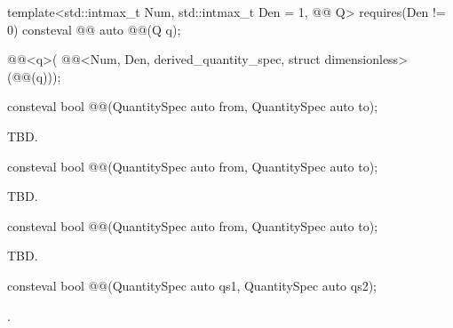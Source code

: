 \begin{itemdecl}
template<std::intmax_t Num, std::intmax_t Den = 1, @@ Q>
  requires(Den != 0)
consteval @@ auto @@(Q q);
\end{itemdecl}

\begin{itemdescr}
\pnum
\returns
\begin{codeblock}
@@<q>(
  @@<Num, Den, derived_quantity_spec, struct dimensionless>(@@(q)));
\end{codeblock}
\end{itemdescr}

\begin{itemdecl}
consteval bool @@(QuantitySpec auto from, QuantitySpec auto to);
\end{itemdecl}

\begin{itemdescr}
\pnum
\returns
TBD.
\end{itemdescr}

\begin{itemdecl}
consteval bool @@(QuantitySpec auto from, QuantitySpec auto to);
\end{itemdecl}

\begin{itemdescr}
\pnum
\returns
TBD.
\end{itemdescr}

\begin{itemdecl}
consteval bool @@(QuantitySpec auto from, QuantitySpec auto to);
\end{itemdecl}

\begin{itemdescr}
\pnum
\returns
TBD.
\end{itemdescr}

\begin{itemdecl}
consteval bool @@(QuantitySpec auto qs1, QuantitySpec auto qs2);
\end{itemdecl}

\begin{itemdescr}
\pnum
\returns
{}.
\end{itemdescr}

